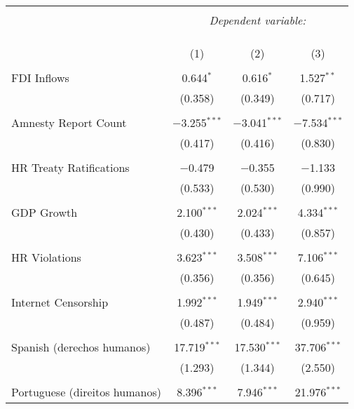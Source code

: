 
\begin{table}[!htbp] \centering 
  \caption{} 
  \label{} 
\begin{tabular}{@{\extracolsep{5pt}}lccc} 
\\[-1.8ex]\hline 
\hline \\[-1.8ex] 
 & \multicolumn{3}{c}{\textit{Dependent variable:}} \\ 
\cline{2-4} 
\\[-1.8ex] & \multicolumn{3}{c}{ } \\ 
\\[-1.8ex] & (1) & (2) & (3)\\ 
\hline \\[-1.8ex] 
 FDI Inflows & 0.644$^{*}$ & 0.616$^{*}$ & 1.527$^{**}$ \\ 
  & (0.358) & (0.349) & (0.717) \\ 
  & & & \\ 
 Amnesty Report Count & $-$3.255$^{***}$ & $-$3.041$^{***}$ & $-$7.534$^{***}$ \\ 
  & (0.417) & (0.416) & (0.830) \\ 
  & & & \\ 
 HR Treaty Ratifications & $-$0.479 & $-$0.355 & $-$1.133 \\ 
  & (0.533) & (0.530) & (0.990) \\ 
  & & & \\ 
 GDP Growth & 2.100$^{***}$ & 2.024$^{***}$ & 4.334$^{***}$ \\ 
  & (0.430) & (0.433) & (0.857) \\ 
  & & & \\ 
 HR Violations & 3.623$^{***}$ & 3.508$^{***}$ & 7.106$^{***}$ \\ 
  & (0.356) & (0.356) & (0.645) \\ 
  & & & \\ 
 Internet Censorship & 1.992$^{***}$ & 1.949$^{***}$ & 2.940$^{***}$ \\ 
  & (0.487) & (0.484) & (0.959) \\ 
  & & & \\ 
 Spanish (derechos humanos) & 17.719$^{***}$ & 17.530$^{***}$ & 37.706$^{***}$ \\ 
  & (1.293) & (1.344) & (2.550) \\ 
  & & & \\ 
 Portuguese (direitos humanos) & 8.396$^{***}$ & 7.946$^{***}$ & 21.976$^{***}$ \\ 

\end{tabular}
\end{table}

